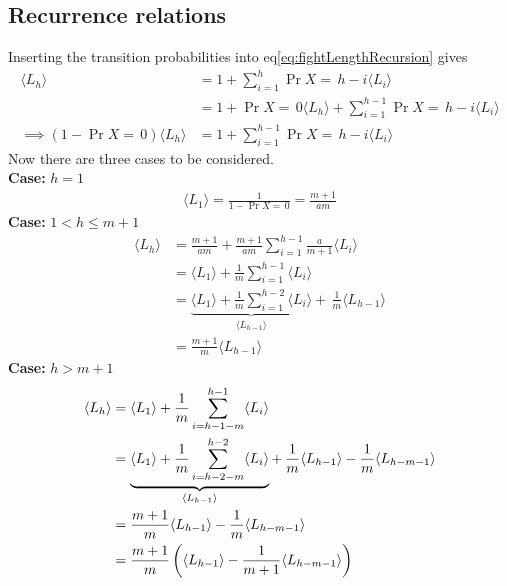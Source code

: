\subsection{Recurrence relations}
Inserting the transition probabilities into eq\ref{eq:fightLengthRecursion} gives
\begin{align}
    \langle L_h \rangle
        &= 1 + \sum_{i=1}^h \Pr{X=\,h-i}\langle L_i\rangle\nonumber\\
        &= 1 + \Pr{X=\,0}\langle L_h \rangle + \sum_{i=1}^{h-1} \Pr{X=\,h-i}\langle L_i \rangle\nonumber\\
    \implies \left(1 - \Pr{X=\,0}\right)\langle L_h \rangle &= 1 + \sum_{i=1}^{h-1} \Pr{X=\,h-i}\langle L_i \rangle\label{eq:noregen1}
\end{align}
Now there are three cases to be considered.\\
\textbf{Case:} $h = 1$
\begin{align}
	\langle L_1 \rangle = \frac{1}{1-\Pr{X=\,0}} = \frac{m+1}{am}
\end{align}
\textbf{Case:} $1 < h \leq m+1$
\begin{align}
	\langle L_h \rangle
		&= \frac{m + 1}{am} + \frac{m+1}{am} \sum_{i=1}^{h-1}\frac{a}{m+1}\langle L_{i} \rangle\nonumber\\
		&= \langle L_{1} \rangle + \frac{1}{m} \sum_{i=1}^{h-1}\langle L_{i} \rangle\nonumber\\
		&= \underbrace{\langle L_{1} \rangle + \frac{1}{m} \sum_{i=1}^{h-2}\langle L_{i} \rangle}_{\langle L_{h-1}\rangle} +\,\frac{1}{m}\langle L_{h-1} \rangle\nonumber\\
		&= \frac{m+1}{m}\langle L_{h-1}\rangle\label{eq:geometricRecurrence}
\end{align}
\textbf{Case:} $h > m+1$
\begin{align}
    \langle L_h \rangle
        &= \langle L_{1} \rangle + \frac{1}{m}\sum_{i=h-1-m}^{\mathclap{h-1}} \langle L_i \rangle\nonumber\\
		&= \underbrace{\langle L_{1} \rangle + \frac{1}{m}\sum_{i=h-2-m}^{h-2} \langle L_i \rangle}_{\langle L_{h-1}\rangle} +\,\frac{1}{m}\langle L_{h-1} \rangle - \frac{1}{m}\langle L_{h-m-1} \rangle\nonumber\\
    	&= \frac{m+1}{m}\langle L_{h-1} \rangle - \frac{1}{m}\langle L_{h-m-1} \rangle\nonumber\\
		&= \frac{m+1}{m}\left(\langle L_{h-1} \rangle - \frac{1}{m+1}\langle L_{h-m-1} \rangle\right) \label{eq:complexRecurrence}
\end{align}

